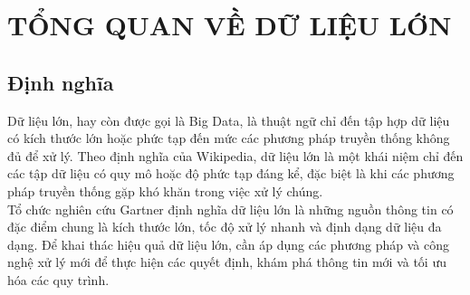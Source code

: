 \chapter[TỔNG QUAN VỀ DỮ LIỆU LỚN]
 {\LARGE TỔNG QUAN VỀ DỮ LIỆU LỚN}

\section{Định nghĩa}
\begin{flushleft}
    Dữ liệu lớn, hay còn được gọi là Big Data, là thuật ngữ chỉ đến tập hợp dữ
    liệu có kích thước lớn hoặc phức tạp đến mức các phương pháp truyền thống
    không đủ để xử lý. Theo định nghĩa của Wikipedia, dữ liệu lớn là một khái
    niệm chỉ đến các tập dữ liệu có quy mô hoặc độ phức tạp đáng kể, đặc biệt
    là khi các phương pháp truyền thống gặp khó khăn trong việc xử lý chúng.\\
    \vspace{0.5cm}
    Tổ chức nghiên cứu Gartner định nghĩa dữ liệu lớn là những nguồn thông tin
    có đặc điểm chung là kích thước lớn, tốc độ xử lý nhanh và định dạng dữ liệu
    đa dạng. Để khai thác hiệu quả dữ liệu lớn, cần áp dụng các phương pháp và
    công nghệ xử lý mới để thực hiện các quyết định, khám phá thông tin mới và
    tối ưu hóa các quy trình.
\end{flushleft}


